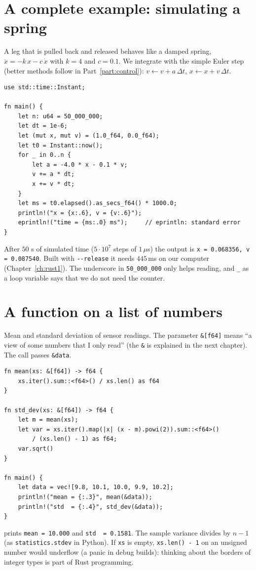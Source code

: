 \section*{A complete example: simulating a spring}
A leg that is pulled back and released behaves like a damped spring, $\ddot x=-k\,x-c\,\dot x$ with $k=4$ and $c=0.1$. We integrate with the simple Euler step (better methods follow in Part~\ref{part:control}): $v\leftarrow v+a\,\Delta t$, $x\leftarrow x+v\,\Delta t$.
\begin{verbatim}
use std::time::Instant;

fn main() {
    let n: u64 = 50_000_000;
    let dt = 1e-6;
    let (mut x, mut v) = (1.0_f64, 0.0_f64);
    let t0 = Instant::now();
    for _ in 0..n {
        let a = -4.0 * x - 0.1 * v;
        v += a * dt;
        x += v * dt;
    }
    let ms = t0.elapsed().as_secs_f64() * 1000.0;
    println!("x = {x:.6}, v = {v:.6}");
    eprintln!("time = {ms:.0} ms");     // eprintln: standard error
}
\end{verbatim}
After $50$ s of simulated time ($5\cdot10^7$ steps of $1\,\mu$s) the output is \verb!x = 0.068356, v = 0.087540!. Built with \verb!--release! it needs $445$\,ms on our computer (Chapter~\ref{ch:rust1}). The underscore in \verb!50_000_000! only helps reading, and \verb!_! as a loop variable says that we do not need the counter.

\section*{A function on a list of numbers}
Mean and standard deviation of sensor readings. The parameter \verb!&[f64]! means ``a view of some numbers that I only read'' (the \verb!&! is explained in the next chapter). The call passes \verb!&data!.
\begin{verbatim}
fn mean(xs: &[f64]) -> f64 {
    xs.iter().sum::<f64>() / xs.len() as f64
}

fn std_dev(xs: &[f64]) -> f64 {
    let m = mean(xs);
    let var = xs.iter().map(|x| (x - m).powi(2)).sum::<f64>()
        / (xs.len() - 1) as f64;
    var.sqrt()
}

fn main() {
    let data = vec![9.8, 10.1, 10.0, 9.9, 10.2];
    println!("mean = {:.3}", mean(&data));
    println!("std  = {:.4}", std_dev(&data));
}
\end{verbatim}
prints \verb!mean = 10.000! and \verb!std  = 0.1581!. The sample variance divides by $n-1$ (as \verb!statistics.stdev! in Python). If \verb!xs! is empty, \verb!xs.len() - 1! on an unsigned number would underflow (a panic in debug builds): thinking about the borders of integer types is part of Rust programming.


